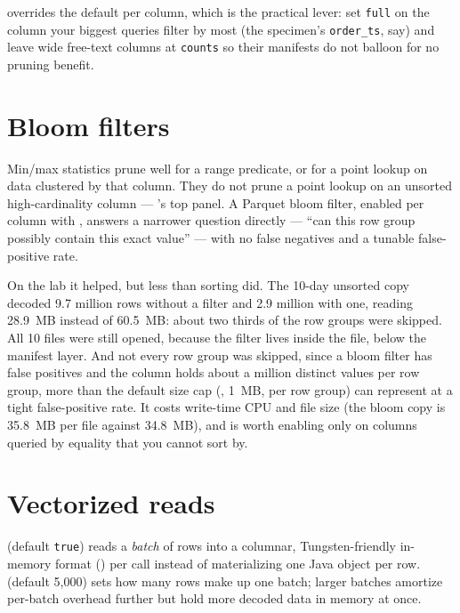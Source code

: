  overrides the default per column,
which is the practical lever: set \texttt{full} on the column your biggest
queries filter by most (the specimen's \texttt{order\_ts}, say) and leave wide
free-text columns at \texttt{counts} so their manifests do not balloon for no
pruning benefit.

\section{Bloom filters}
\label{sec:ice-read-bloom}

Min/max statistics prune well for a range predicate, or for a point lookup on
data clustered by that column. They do not prune a point lookup on an unsorted
high-cardinality column --- 's top panel. A Parquet
bloom filter, enabled per column with
, answers a narrower
question directly --- ``can this row group possibly contain this exact value'' ---
with no false negatives and a tunable false-positive rate.

On the lab it helped, but less than sorting did. The 10-day unsorted copy
decoded 9.7 million rows without a filter and 2.9 million with one, reading 28.9~MB
instead of 60.5~MB: about two thirds of the row groups were skipped. All 10 files
were still opened, because the filter lives inside the file, below the manifest
layer. And not every row group was skipped, since a bloom filter has false
positives and the column holds about a million distinct values per row group,
more than the default size cap
(, 1~MB, per row group) can
represent at a tight false-positive rate. It costs write-time CPU and file size
(the bloom copy is 35.8~MB per file against 34.8~MB), and is worth enabling only
on columns queried by equality that you cannot sort by.

\section{Vectorized reads}
\label{sec:ice-read-vectorized}

 (default \texttt{true}) reads a
\emph{batch} of rows into a columnar, Tungsten-friendly in-memory format
() per call instead of materializing one Java object per row.
 (default 5,000) sets how many rows
make up one batch; larger batches amortize per-batch overhead further but hold
more decoded data in memory at once.

